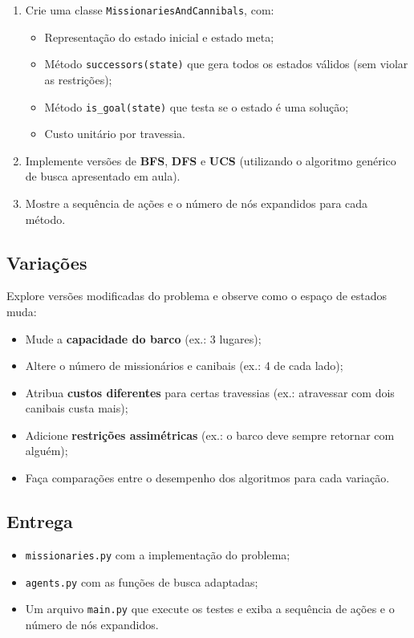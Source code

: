 \documentclass[9pt,a4paper]{extarticle}
\begin{document}
\begin{enumerate}
  \item Crie uma classe \texttt{MissionariesAndCannibals}, com:
  \begin{itemize}
    \item Representação do estado inicial e estado meta;
    \item Método \texttt{successors(state)} que gera todos os estados válidos (sem violar as restrições);
    \item Método \texttt{is\_goal(state)} que testa se o estado é uma solução;
    \item Custo unitário por travessia.
  \end{itemize}
  
  \item Implemente versões de \textbf{BFS}, \textbf{DFS} e \textbf{UCS} (utilizando o algoritmo genérico de busca apresentado em aula).
  
  \item Mostre a sequência de ações e o número de nós expandidos para cada método.
\end{enumerate}

\subsection*{Variações}

Explore versões modificadas do problema e observe como o espaço de estados muda:
\begin{itemize}
  \item Mude a \textbf{capacidade do barco} (ex.: 3 lugares);
  \item Altere o número de missionários e canibais (ex.: 4 de cada lado);
  \item Atribua \textbf{custos diferentes} para certas travessias (ex.: atravessar com dois canibais custa mais);
  \item Adicione \textbf{restrições assimétricas} (ex.: o barco deve sempre retornar com alguém);
  \item Faça comparações entre o desempenho dos algoritmos para cada variação.
\end{itemize}

\subsection*{Entrega}

\begin{itemize}
  \item \texttt{missionaries.py} com a implementação do problema;
  \item \texttt{agents.py} com as funções de busca adaptadas;
  \item Um arquivo \texttt{main.py} que execute os testes e exiba a sequência de ações e o número de nós expandidos.
\end{itemize}
\end{document}
